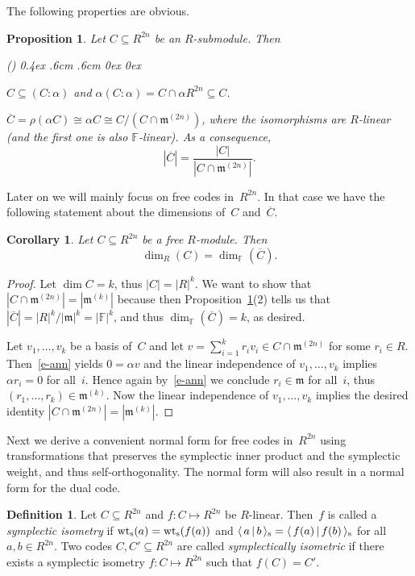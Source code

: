 \documentclass[11pt]{article}
\newtheorem{prop}[theo]{Proposition}
\newtheorem{cor}[theo]{Corollary}
\theoremstyle{definition}
\newtheorem{defi}[theo]{Definition}
\numberwithin{equation}{section}
\newcommand{\F}{{\mathbb F}}
\newcommand{\mm}{{\mathfrak m}}
\newcommand{\wts}{\mbox{${\rm wt}_{\rm s}$}}
\newcommand{\inners}[2]{\mbox{$\langle{\,{#1}\,}|\,{#2}\,\rangle_{\rm s}$}}
\newcommand{\ov}[1]{\mbox{$\overline{#1}$}}
\newcounter{alp}
\newcounter{ara}
\newenvironment{arabiclist}{\begin{list}{(\arabic{ara})\hfill}{\usecounter{ara}
     \topsep0.4ex \labelwidth.6cm \leftmargin.6cm \labelsep0cm
     \rightmargin0cm \parsep0ex \itemsep0ex}}{\end{list}}
\begin{document}
The following properties are obvious.

\begin{prop}\label{P-CCbar}
Let $C\subseteq R^{2n}$ be an $R$-submodule.
Then
\begin{arabiclist}
\item $C\subseteq (C:\alpha)$ and $\alpha(C:\alpha)=C\cap \alpha R^{2n}\subseteq C$.
\item $\ov{C}=\rho(\alpha C)\cong\alpha C\cong C/(C\cap\mm^{(2n)})$,
        where the isomorphisms are $R$-linear (and the first one is also $\F$-linear).
        As a consequence,
        \[
           |\ov{C}|=\frac{|C|}{|C\cap\mm^{(2n)}|}.
        \]
\end{arabiclist}
\end{prop}


Later on we will mainly focus on free codes in~$R^{2n}$.
In that case we have the following statement about the dimensions of~$C$ and~$\ov{C}$.

\begin{cor}\label{C-DimFree}
Let $C\subseteq R^{2n}$ be a free $R$-module. Then
\[
   \dim_R(C)=\dim_{\F}(\ov{C}).
\]
\end{cor}

\begin{proof}
Let $\dim C=k$, thus $|C|=|R|^k$.
We want to show that $|C\cap\mm^{(2n)}|=|\mm^{(k)}|$ because then Proposition~\ref{P-CCbar}(2) tells us that
$|\ov{C}|=|R|^k/|\mm|^k=|\F|^k$, and thus $\dim_{\F}(\ov{C})=k$, as desired.

Let $v_1,\ldots,v_k$ be a basis of~$C$ and let $v=\sum_{i=1}^kr_i v_i\in C\cap\mm^{(2n)}$ for some $r_i\in R$.
Then~\eqref{e-ann} yields $0=\alpha v$ and the linear independence of $v_1,\ldots,v_k$ implies
$\alpha r_i=0$ for all~$i$.
Hence again by~\eqref{e-ann} we conclude $r_i\in\mm$ for all~$i$, thus $(r_1,\ldots,r_k)\in\mm^{(k)}$.
Now the linear independence of $v_1,\ldots,v_k$ implies the desired identity $|C\cap\mm^{(2n)}|=|\mm^{(k)}|$.
\end{proof}

Next we derive a convenient normal form for free codes in~$R^{2n}$ using
transformations that preserves the symplectic inner product and the symplectic weight, and thus self-orthogonality.
The normal form will also result in a normal form for the dual code.

\begin{defi}\label{D-Iso}
Let $C\subseteq R^{2n}$ and $f:C\longmapsto R^{2n}$ be $R$-linear.
Then~$f$ is called a \emph{symplectic isometry} if $\wts(a) = \wts(f(a))$ and
$\inners{a}{b} = \inners{f(a)}{f(b)}$ for all $a,b \in R^{2n}$.
Two codes $C,C'\subseteq R^{2n}$ are called \emph{symplectically isometric} if there exists a symplectic isometry
$f:C\longmapsto R^{2n}$ such that $f(C)=C'$.
\end{defi}
\end{document}
